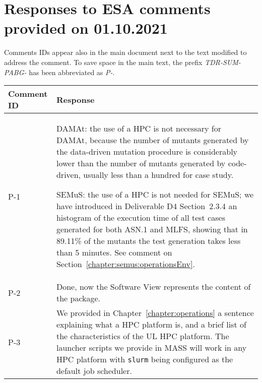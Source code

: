 
\section{Responses to ESA comments provided on 01.10.2021}
\label{sec:ESA:comments:2}

Comments IDs appear also in the main document next to the text modified to address the comment. To save space in the main text, the prefix \emph{TDR-SUM-PABG-} has been abbreviated as \emph{P-}.

\setlength\LTleft{0pt}
\setlength\LTright{0pt}
\footnotesize
\begin{longtable}{|p{1.5cm}|p{12cm}|@{}}
\textbf{Comment ID}&\textbf{Response}\\
\hline
P-1&
\begin{minipage}{12cm}
DAMAt: the use of a HPC is not necessary for DAMAt, because the number of mutants generated by the data-driven mutation procedure is considerably lower than the number of mutants generated by code-driven, usually less than a hundred for case study.

SEMuS: the use of a HPC is not needed for SEMuS; we have introduced in Deliverable D4 Section~2.3.4 an histogram of the execution time of all test cases generated for both ASN.1 and MLFS, showing that in 89.11\% of the mutants the test generation takes less than 5 minutes. See comment on Section~\ref{chapter:semus:operationsEnv}.


\end{minipage}\\
\hline

P-2&
\begin{minipage}{12cm}
Done, now the Software View represents the content of the package.
\end{minipage}\\
\hline

P-3&
\begin{minipage}{12cm}
We provided in Chapter~\ref{chapter:operations} a sentence explaining what a HPC platform is, and a brief list of the characteristics of the UL HPC platform.
The launcher scripts we provide in MASS will work in any HPC platform with \texttt{slurm} being configured as the default job scheduler.
\end{minipage}\\
\hline


\end{longtable}
